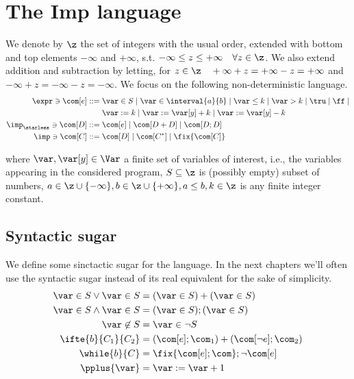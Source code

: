 \section{The Imp language}

We denote by \(\z\) the set of integers with the usual order, extended
with bottom and top elements \(-\infty\) and \(+\infty\),
s.t. \(-\infty \leq z \leq +\infty \quad \forall z \in \z\). We also
extend addition and subtraction by letting, for \(z \in \z \quad
+\infty + z = + \infty - z = + \infty\) and \(-\infty + z = - \infty
-z = - \infty\).  We focus on the following non-deterministic
language.
\begin{align*}
  \expr \ni \com[e] ::= & \; \var \in S \mid \var \in \interval{a}{b} \mid \var \leq k \mid \var > k \mid \tru \mid \ff \mid \\
  & \; \var := k \mid \var := \var[y] + k \mid \var := \var[y] - k \\
  \imp_\starless \ni \com[D] ::= & \; \com[e] \mid \com[D + D] \mid \com[D ; D] \\
  \imp \ni \com[C] ::= & \; \com[D] \mid \com[C^*] \mid \fix{\com[C]}
\end{align*}

where \(\var, \var[y] \in \Var\) a finite set of variables of interest, i.e.,
the variables appearing in the considered program, \(S\subseteq \z\)
is (possibly empty) subset of numbers, \(a \in \z\cup \{-\infty\},
b\in\z\cup\{+\infty\}, a\leq b, k \in \z\) is any finite integer
constant.

\subsection{Syntactic sugar}
\label{subsec:syncsugar}
We define some sinctactic sugar for the language. In the next chapters
we'll often use the syntactic sugar instead of its real equivalent for
the sake of simplicity.
\begin{align*}
\var \in S \vee \var \in S & = (\var \in S) + (\var \in S) \\ 
\var \in S \wedge \var \in S & = (\var \in S);(\var \in S) \\
\var \not\in S & = \var \in \neg S \\
\ifte{b}{C_1}{C_2} & = (\com[e];\com_1) + (\com[\neg e];\com_2) \\
\while{b}{C} & = \fix{\com[e];\com};\neg\com[e] \\
\pplus{\var} & = \var := \var + 1
\end{align*}
